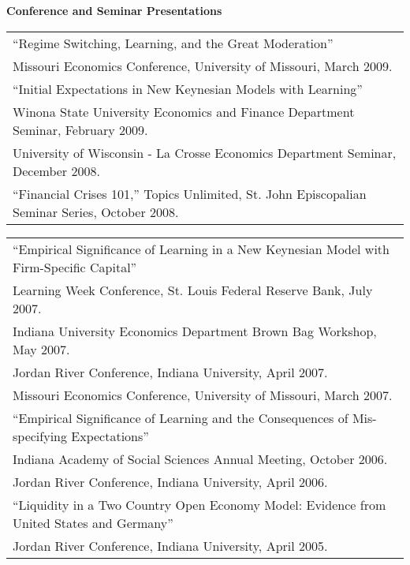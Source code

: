 \documentclass[11pt]{article}
\newcommand{\toprule}{\par\vspace*{2pt}\noindent{\hrule\hfill}\par\vspace*{1pt}}
\begin{document}
\textbf{Conference and Seminar Presentations} \toprule
\hspace*{-0.5pc}\begin{tabular}{p{6.5in}}
``Regime Switching, Learning, and the Great Moderation''\\
\hspace*{1pc} Missouri Economics Conference, University of Missouri, March 2009.\\

``Initial Expectations in New Keynesian Models with Learning''\\
\hspace*{1pc} Winona State University Economics and Finance Department Seminar, February 2009.\\
\hspace*{1pc} University of Wisconsin - La Crosse Economics Department Seminar, December 2008.\\
``Financial Crises 101,'' Topics Unlimited, St. John Episcopalian Seminar Series, October 2008.\\
\end{tabular}

\hspace*{-0.5pc}\begin{tabular}{p{6.5in}}

``Empirical Significance of Learning in a New Keynesian Model with Firm-Specific Capital''\\
\hspace*{1pc} Learning Week Conference, St. Louis Federal Reserve Bank, July 2007.\\
\hspace*{1pc} Indiana University Economics Department Brown Bag Workshop, May 2007.\\
\hspace*{1pc} Jordan River Conference, Indiana University, April 2007.\\
\hspace*{1pc} Missouri Economics Conference, University of Missouri, March 2007.\\

``Empirical Significance of Learning and the Consequences of Mis-specifying Expectations''\\
\hspace*{1pc} Indiana Academy of Social Sciences Annual Meeting, October 2006.\\
\hspace*{1pc} Jordan River Conference, Indiana University, April 2006.\\

``Liquidity in a Two Country Open Economy Model: Evidence from United States and Germany''\\
\hspace*{1pc} Jordan River Conference, Indiana University, April 2005.
\end{tabular} \\
\end{document}
